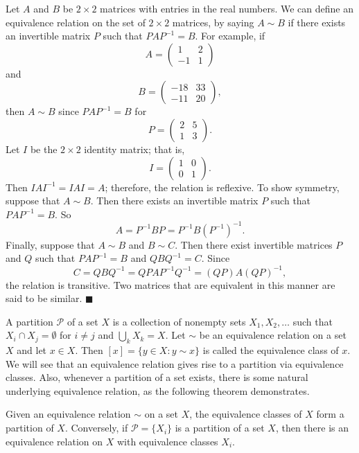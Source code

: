 Let $A$ and $B$ be \mbox{$2 \times 2$} matrices with entries in the real numbers. We can define an equivalence relation on the set of $2 \times 2$ matrices, by saying $A \sim B$ if there exists an invertible matrix $P$ such that $PAP^{-1} = B$.  For example, if 
$$
A =
\begin{pmatrix}
1 & 2 \\
-1 & 1
\end{pmatrix}
$$
and
$$
B =
\begin{pmatrix}
-18 & 33 \\
-11 & 20
\end{pmatrix},
$$
then $A \sim B$ since $PAP^{-1} = B$ for
$$
P =
\begin{pmatrix}
2 & 5 \\
1 & 3
\end{pmatrix}.
$$
Let $I$ be the $2 \times 2$ identity matrix; that is,
$$
I =
\begin{pmatrix}
1 & 0 \\
0 & 1
\end{pmatrix}.
$$
Then $IAI^{-1} = IAI = A$; therefore, the relation is reflexive.  To show symmetry, suppose that $A \sim B$.  Then there exists an invertible matrix $P$ such that $PAP^{-1} = B$.  So 
$$
A = P^{-1} B P = P^{-1} B (P^{-1})^{-1}.
$$
Finally, suppose that $A \sim B$ and $B \sim C$.  Then there exist invertible matrices $P$ and $Q$ such that $PAP^{-1} = B$ and  $QBQ^{-1} = C$.  Since 
$$
C = QBQ^{-1} = QPAP^{-1} Q^{-1} = (QP)A(QP)^{-1},
$$
the relation is transitive.  Two matrices that are equivalent in this manner are said to be {\bfi similar}. 
\hspace{\fill} $\blacksquare$

\medskip

A {\bfi partition} ${\mathcal P}$ of a set $X$ is a collection of nonempty sets $X_1, X_2, \ldots$ such that $X_i \cap X_j = \emptyset$ for $i  \neq j$ and $\bigcup_k X_k = X$. Let $\sim$ be an equivalence relation on a set $X$ and let $x \in X$.  Then $[x] = \{ y \in X : y \sim x \}$ is called the {\bfi equivalence class\/} of $x$.  We will see that an equivalence relation gives rise to a partition via equivalence classes.  Also, whenever a partition of a set exists, there is some natural  underlying equivalence relation, as the following theorem demonstrates.  
 
\begin{theorem}\label{sets_theorem_5}
Given an equivalence relation $\sim$ on a set $X$, the equivalence classes of $X$ form a partition of $X$.  Conversely, if ${\mathcal P} = \{ X_i\}$ is a partition of a set $X$, then there is an equivalence relation on $X$ with equivalence classes $X_i$. 
\end{theorem}

